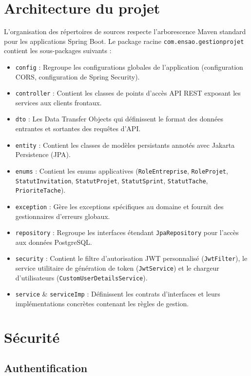 \documentclass[12pt,a4paper]{report}
\begin{document}
\section{Architecture du projet}

L'organisation des répertoires de sources respecte l'arborescence Maven standard pour les applications Spring Boot. Le package racine \verb|com.ensao.gestionprojet| contient les sous-packages suivants :
\begin{itemize}
\item \verb|config| : Regroupe les configurations globales de l'application (configuration CORS, configuration de Spring Security).
\item \verb|controller| : Contient les classes de points d'accès API REST exposant les services aux clients frontaux.
\item \verb|dto| : Les Data Transfer Objects qui définissent le format des données entrantes et sortantes des requêtes d'API.
\item \verb|entity| : Contient les classes de modèles persistants annotés avec Jakarta Persistence (JPA).
\item \verb|enums| : Contient les enums applicatives (\verb|RoleEntreprise|, \verb|RoleProjet|, \verb|StatutInvitation|, \verb|StatutProjet|, \verb|StatutSprint|, \verb|StatutTache|, \verb|PrioriteTache|).
\item \verb|exception| : Gère les exceptions spécifiques au domaine et fournit des gestionnaires d'erreurs globaux.
\item \verb|repository| : Regroupe les interfaces étendant \verb|JpaRepository| pour l'accès aux données PostgreSQL.
\item \verb|security| : Contient le filtre d'autorisation JWT personnalisé (\verb|JwtFilter|), le service utilitaire de génération de token (\verb|JwtService|) et le chargeur d'utilisateurs (\verb|CustomUserDetailsService|).
\item \verb|service| \& \verb|serviceImp| : Définissent les contrats d'interfaces et leurs implémentations concrètes contenant les règles de gestion.
\end{itemize}

\section{Sécurité}

\subsection{Authentification}
\end{document}
